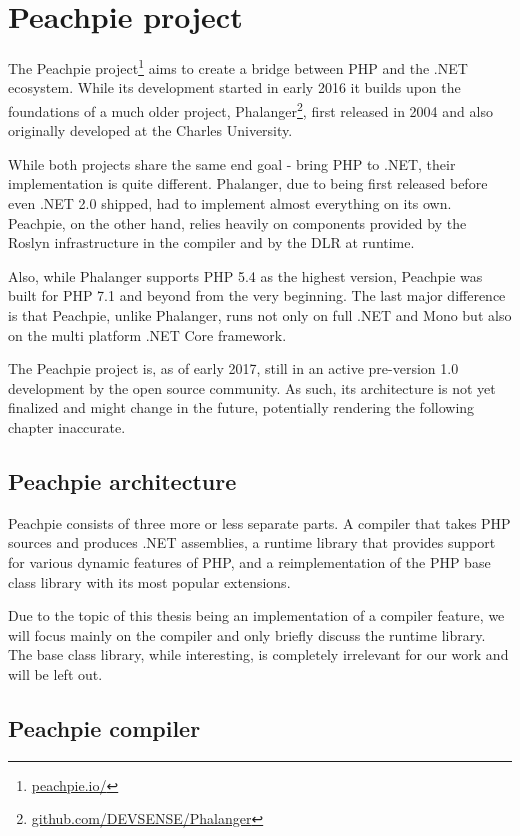 \chapter{Peachpie project}

The Peachpie project\footnote{\href{http://www.peachpie.io/}{peachpie.io/}} aims to create a bridge between PHP and the .NET ecosystem. While its development started in early 2016 it builds upon the foundations of a much older project, Phalanger\footnote{\href{https://github.com/DEVSENSE/Phalanger}{github.com/DEVSENSE/Phalanger}}, first released in 2004 and also originally developed at the Charles University.

While both projects share the same end goal - bring PHP to .NET, their implementation is quite different. Phalanger, due to being first released before even .NET 2.0 shipped, had to implement almost everything on its own. Peachpie, on the other hand, relies heavily on components provided by the Roslyn infrastructure in the compiler and by the DLR at runtime.

Also, while Phalanger supports PHP 5.4 as the highest version, Peachpie was built for PHP 7.1 and beyond from the very beginning. The last major difference is that Peachpie, unlike Phalanger, runs not only on full .NET and Mono but also on the multi platform .NET Core framework.

The Peachpie project is, as of early 2017, still in an active pre-version 1.0 development by the open source community. As such, its architecture is not yet finalized and might change in the future, potentially rendering the following chapter inaccurate.


\section{Peachpie architecture}

Peachpie consists of three more or less separate parts. A compiler that takes PHP sources and produces .NET assemblies, a runtime library that provides support for various dynamic features of PHP, and a reimplementation of the PHP base class library with its most popular extensions. 

Due to the topic of this thesis being an implementation of a compiler feature, we will focus mainly on the compiler and only briefly discuss the runtime library. The base class library, while interesting, is completely irrelevant for our work and will be left out.


\section{Peachpie compiler}

